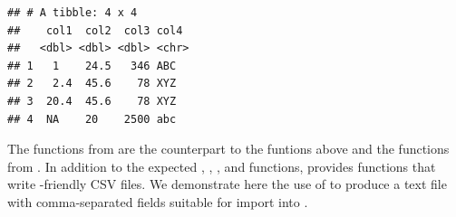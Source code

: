 \documentclass[krantz2]{krantz}\usepackage{knitr}%
\begin{document}
\begin{explainbox}
\begin{knitrout}\footnotesize
{}\color{fgcolor}\begin{kframe}
\begin{alltt}
\hlstd{(} \hlstd{=} \hlstd{,}  \hlstd{=} \hlstd{)}
\end{alltt}


{\ttfamily\noindent\itshape\color{messagecolor}{\#\# Parsed with column specification:\\\#\# cols(\\\#\#\ \  col1 = col\_double(),\\\#\#\ \  col2 = col\_double(),\\\#\#\ \  col3 = col\_double(),\\\#\#\ \  col4 = col\_character()\\\#\# )}}

{\ttfamily\noindent\color{warningcolor}{\#\# Warning: 1 parsing failure.\\\#\# row\ \ col expected actual\ \ \ \ \ \ \ \ \ \ \ \ \ \ \ \ \ \ \ \ \ \ \ \ \ \ \ \  file\\\#\#\ \  4 col1 a double\ \ \ \ \ \ a 'extdata/miss-aligned-ASCII.txt'}}\begin{verbatim}
## # A tibble: 4 x 4
##    col1  col2  col3 col4 
##   <dbl> <dbl> <dbl> <chr>
## 1   1    24.5   346 ABC  
## 2   2.4  45.6    78 XYZ  
## 3  20.4  45.6    78 XYZ  
## 4  NA    20    2500 abc
\end{verbatim}
\end{kframe}
\end{knitrout}
\end{explainbox}

The  functions from  are the counterpart to the  funtions above and the  functions from . In addition to the expected , , ,  and  functions,  provides functions that write -friendly CSV files. We demonstrate here the use of  to produce a text file with comma-separated fields suitable for import into .

\begin{knitrout}\footnotesize
{}\color{fgcolor}\begin{kframe}
\begin{alltt}
  \hlstd{=} \hlstd{)}
\hlstd{(}\hlstd{,}  \hlstd{=} \hlstd{)}
\end{alltt}
\end{kframe}
\end{knitrout}
\end{document}
